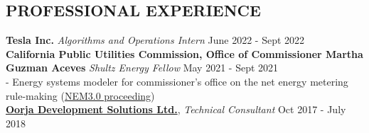 \documentclass[centered, 11pt]{res}
\begin{document}
\begin{resume}
\section{PROFESSIONAL EXPERIENCE}
\textbf{Tesla Inc.}
\textit{Algorithms and Operations Intern} \hfill June 2022 - Sept 2022\\
\textbf{California Public Utilities Commission, Office of Commissioner Martha Guzman Aceves}
\textit{Shultz Energy Fellow} \hfill May 2021 - Sept 2021\\
- Energy systems modeler for commissioner's office on the net energy metering rule-making (\href{https://www.cpuc.ca.gov/nemrevisit}{NEM3.0 proceeding})\\
\href{http://www.oorjasolutions.org}{\textbf{Oorja Development Solutions Ltd.}}, \textit{Technical Consultant} \hfill Oct 2017 - July 2018

\end{resume}
\end{document}

